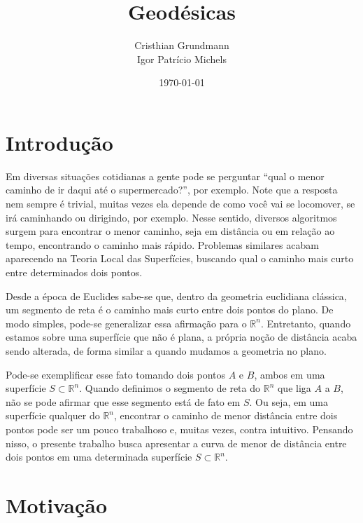 \documentclass{article}
\title{Geodésicas}
\author{Cristhian Grundmann \\ Igor Patrício Michels}
\date{\today}
\begin{document}
\maketitle
\section{Introdução}

Em diversas situações cotidianas a gente pode se perguntar ``qual o menor caminho de ir daqui até o supermercado?'', por exemplo. Note que a resposta nem sempre é trivial, muitas vezes ela depende de como você vai se locomover, se irá caminhando ou dirigindo, por exemplo. Nesse sentido, diversos algoritmos surgem para encontrar o menor caminho, seja em distância ou em relação ao tempo, encontrando o caminho mais rápido. Problemas similares acabam aparecendo na Teoria Local das Superfícies, buscando qual o caminho mais curto entre determinados dois pontos.

Desde a época de Euclides sabe-se que, dentro da geometria euclidiana clássica, um segmento de reta é o caminho mais curto entre dois pontos do plano. De modo simples, pode-se generalizar essa afirmação para o $\mathbb{R}^n$. Entretanto, quando estamos sobre uma superfície que não é plana, a própria noção de distância acaba sendo alterada, de forma similar a quando mudamos a geometria no plano.

Pode-se exemplificar esse fato tomando dois pontos $A$ e $B$, ambos em uma superfície $S\subset \mathbb{R}^n$. Quando definimos o segmento de reta do $\mathbb{R}^n$ que liga $A$ a $B$, não se pode afirmar que esse segmento está de fato em $S$. Ou seja, em uma superfície qualquer do $\mathbb{R}^n$, encontrar o caminho de menor distância entre dois pontos pode ser um pouco trabalhoso e, muitas vezes, contra intuitivo. Pensando nisso, o presente trabalho busca apresentar a curva de menor de distância entre dois pontos em uma determinada superfície $S\subset \mathbb{R}^n$.

\section{Motivação}
\end{document}
